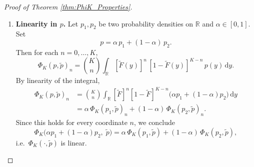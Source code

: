 \documentclass{article}
\begin{document}
\begin{proof}[Proof of Theorem \ref{thm:PhiK_Properties}]
\begin{enumerate}[label=(\roman*)]
    \medskip\noindent
    \textbf{Continuity in \(p\).}  
    Fix \(\tilde p\) (and write \(\tilde F\) for its cdf).  For each \(m=0,\dots,K\),
    \[
    \bigl[\Phi_K(p_i,\tilde p)\bigr]_m
    -\bigl[\Phi_K(p,\tilde p)\bigr]_m
    =\binom Km
    \int_{\mathbb{R}}
    [\tilde F(y)]^m[1-\tilde F(y)]^{K-m}
    \bigl(p_i(y)-p(y)\bigr)\,\mathrm{d} y.
    \]
    Taking absolute values and using \(\int|p_i-p|=\|p_i-p\|_{L^1}\) yields
    \[
    \bigl|\Phi_K(p_i,\tilde p)_m-\Phi_K(p,\tilde p)_m\bigr|
    \;\le\;\binom Km\,
    \|p_i-p\|_{L^1}.
    \]
    Summing over \(m\) gives
    \begin{align}\label{eq3:proof continuity of phi}
    \nonumber \bigl\|\Phi_K(p_i,\tilde p)-\Phi_K(p,\tilde p)\bigr\|_{\ell^1}
    =&\sum_{m=0}^K\bigl|\Phi_K(p_i,\tilde p)_m-\Phi_K(p,\tilde p)_m\bigr|
    \\\;\le\;&
    \nonumber \Bigl(\sum_{m=0}^K\binom Km\Bigr)
    \|p_i-p\|_{L^1}
    \\\;=\;&2^K\,\|p_i-p\|_{L^1}\longrightarrow 0.
    \end{align}
    Since \(p_i\to p\) in \(L^1\), the right‐hand side tends to zero.  Hence \(\Phi_K(\cdot,\tilde p)\) is continuous in its first argument. 

    \medskip\noindent
    Combining in Equations \ref{eq1:proof continuity of phi}, \ref{eq2:proof continuity of phi} and \ref{eq3:proof continuity of phi} yields
    \[
    \bigl\|\Phi_K(p_i,\tilde p_j)-\Phi_K(p,\tilde p)\bigr\|_{\ell^1}
    \;\longrightarrow\;0,
    \]
    i.e.\ \(\Phi_K\) is jointly continuous in \((p,\tilde p)\).

    \item  
    \medskip\noindent
    \textbf{Linearity in \(p\).}  
    Let \(p_1,p_2\) be two probability densities on \(\mathbb{R}\) and \(\alpha\in[0,1]\).  Set
    \[
    p=\alpha\,p_1+(1-\alpha)\,p_2.
    \]
    Then for each \(n=0,\dots,K\),
    \[
    \Phi_K(p,\tilde p)_n
    =\binom{K}{n}
    \int_{\mathbb{R}}[\tilde F(y)]^n\,[1-\tilde F(y)]^{K-n}\,p(y)\,\mathrm{d} y.
    \]
    By linearity of the integral,
    \begin{align*}
    \Phi_K(p,\tilde p)_n
    &=\binom{K}{n}\!\int_{\mathbb{R}}[\tilde F]^n[1-\tilde F]^{K-n}
    \bigl(\alpha p_1+(1-\alpha)p_2\bigr)\,\mathrm{d} y\\
    &=\alpha\,\Phi_K(p_1,\tilde p)_n+(1-\alpha)\,\Phi_K(p_2,\tilde p)_n.
    \end{align*}
    Since this holds for every coordinate \(n\), we conclude
    \[
    \Phi_K\bigl(\alpha p_1+(1-\alpha)p_2,\;\tilde p\bigr)
    =\alpha\,\Phi_K(p_1,\tilde p)+(1-\alpha)\,\Phi_K(p_2,\tilde p),
    \]
    i.e.\ \(\Phi_K(\cdot,\tilde p)\) is linear.
    

\end{enumerate}
\end{proof}
\end{document}
